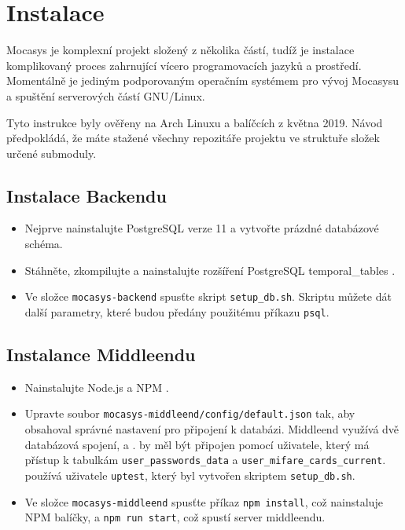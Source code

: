 \chapter{Instalace}

Mocasys je komplexní projekt složený z několika částí, tudíž je instalace
komplikovaný proces zahrnující vícero programovacích jazyků a prostředí.
Momentálně je jediným podporovaným operačním systémem pro vývoj Mocasysu a
spuštění serverových částí GNU/Linux.

Tyto instrukce byly ověřeny na Arch Linuxu a balíčcích z května 2019. Návod
předpokládá, že máte stažené všechny repozitáře projektu ve struktuře složek
určené submoduly.

\section{Instalace Backendu}

\begin{itemize}
    \item Nejprve nainstalujte PostgreSQL \citep[viz][]{PostgreSQL} verze 11 a
    vytvořte prázdné databázové schéma.
    
    \item Stáhněte, zkompilujte a nainstalujte rozšíření PostgreSQL
    temporal\_tables \citep[viz][]{TemporalTables}.

    \item Ve složce \texttt{mocasys-backend} spusťte skript
    \texttt{setup\_db.sh}. Skriptu můžete dát další parametry, které budou
    předány použitému příkazu \texttt{psql}.
\end{itemize}

\section{Instalance Middleendu}

\begin{itemize}
    \item Nainstalujte Node.js \citep[viz][]{NodeJs} a NPM \citep[viz][]{Npm}.

    \item Upravte soubor \texttt{mocasys-middleend/config/default.json} tak,
    aby obsahoval správné nastavení pro připojení k databázi. Middleend využívá
    dvě databázová spojení,  a .  by měl
    být připojen pomocí uživatele, který má přístup k tabulkám
    \texttt{user\_passwords\_data} a \texttt{user\_mifare\_cards\_current}.
     používá uživatele \texttt{uptest}, který byl vytvořen skriptem
    \texttt{setup\_db.sh}.

    \item Ve složce \texttt{mocasys-middleend} spusťte příkaz
    \verb|npm install|, což nainstaluje NPM balíčky, a
    \texttt{npm run start}, což spustí server middleendu.
\end{itemize}

